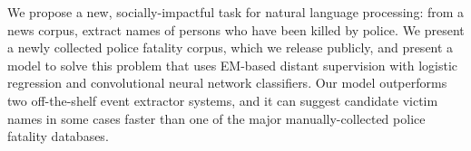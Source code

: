 We propose a new, socially-impactful task for natural language processing: from a news corpus, extract names of persons who have been killed by police. We present a newly collected police fatality corpus, which we release publicly, and present a model to solve this problem that uses EM-based distant supervision with logistic regression and convolutional neural network classifiers. Our model outperforms two off-the-shelf event extractor systems, and it can suggest candidate victim names in some cases faster than one of the major manually-collected police fatality databases.
